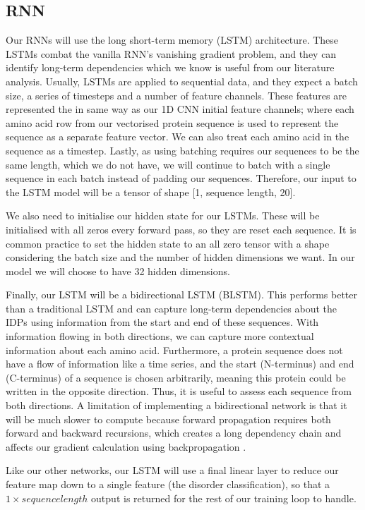 \documentclass{l4proj}
\begin{document}
\subsection{RNN}
\label{chap:design section:rnn}

Our RNNs will use the long short-term memory (LSTM) architecture. These LSTMs combat the vanilla RNN’s vanishing gradient problem, and they can identify long-term dependencies which we know is useful from our literature analysis. Usually, LSTMs are applied to sequential data, and they expect a batch size, a series of timesteps and a number of feature channels. These features are represented the in same way as our 1D CNN initial feature channels; where each amino acid row from our vectorised protein sequence is used to represent the sequence as a separate feature vector. We can also treat each amino acid in the sequence as a timestep. Lastly, as using batching requires our sequences to be the same length, which we do not have, we will continue to batch with a single sequence in each batch instead of padding our sequences. Therefore, our input to the LSTM model will be a tensor of shape [1, sequence length, 20]. 

We also need to initialise our hidden state for our LSTMs. These will be initialised with all zeros every forward pass, so they are reset each sequence. It is common practice to set the hidden state to an all zero tensor with a shape considering the batch size and the number of hidden dimensions we want. In our model we will choose to have 32 hidden dimensions. 

Finally, our LSTM will be a bidirectional LSTM (BLSTM). This performs better than a traditional LSTM and can capture long-term dependencies about the IDPs using information from the start and end of these sequences. With information flowing in both directions, we can capture more contextual information about each amino acid. Furthermore, a protein sequence does not have a flow of information like a time series, and the start (N-terminus) and end (C-terminus) of a sequence is chosen arbitrarily, meaning this protein could be written in the opposite direction. Thus, it is useful to assess each sequence from both directions. A limitation of implementing a bidirectional network is that it will be much slower to compute because forward propagation requires both forward and backward recursions, which creates a long dependency chain and affects our gradient calculation using backpropagation \citep{Zhang:2021}.  

Like our other networks, our LSTM will use a final linear layer to reduce our feature map down to a single feature (the disorder classification), so that a $1\times sequence length$ output is returned for the rest of our training loop to handle.
\end{document}
